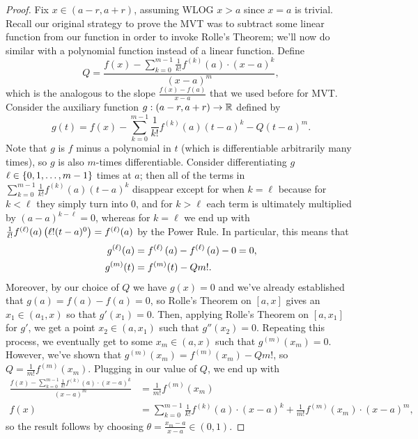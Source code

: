 \documentclass[main.tex]{subfiles}
\begin{document}
\begin{proof}
    Fix $x\in (a - r, a + r)$, assuming WLOG $x > a$ since $x = a$ is trivial. Recall our original strategy to prove the MVT was to subtract some linear function from our function in order to invoke Rolle's Theorem; we'll now do similar with a polynomial function instead of a linear function. Define
    \[Q = \frac{f(x) - \sum_{k = 0}^{m - 1} \frac{1}{k!}f^{(k)}(a)\cdot (x - a)^k}{(x - a)^{m}},\]
    which is the analogous to the slope $\frac{f(x) - f(a)}{x - a}$ that we used before for MVT. Consider the auxiliary function $g : (a - r, a + r) \to \mathbb R$ defined by
    \[g(t) = f(x) - \sum_{k = 0}^{m - 1} \frac{1}{k!}f^{(k)}(a)(t - a)^k - Q(t - a)^m.\]
    Note that $g$ is $f$ minus a polynomial in $t$ (which is differentiable arbitrarily many times), so $g$ is also $m$-times differentiable. Consider differentiating $g$ $\ell\in \left\{ 0, 1, \ldots , m - 1 \right\}$ times at $a$; then all of the terms in $\sum_{k = 0}^{m - 1} \frac{1}{k!}f^{(k)}(a)(t - a)^k$ disappear except for when $k = \ell$ because for $k < \ell$ they simply turn into $0$, and for $k > \ell$ each term is ultimately multiplied by $(a - a)^{k - \ell} = 0$, whereas for $k = \ell$ we end up with $\frac{1}{\ell!}f^{(\ell)}(a)\left( \ell!(t - a)^0 \right) = f^{(\ell)}(a)$ by the Power Rule. In particular, this means that
    \begin{align*}
        g^{(\ell)}(a) &= f^{(\ell)}\left( a \right) - f^{(\ell)}\left( a \right) - 0 = 0, \\
        g^{(m)}(t) &= f^{(m)}(t) - Qm!.
    \end{align*}
    Moreover, by our choice of $Q$ we have $g(x) = 0$ and we've already established that $g(a) = f(a) - f(a) = 0$, so Rolle's Theorem on $[a, x]$ gives an $x_1\in (a_1, x)$ so that $g'(x_1) = 0$. Then, applying Rolle's Theorem on $[a, x_1]$ for $g'$, we get a point $x_2\in (a, x_1)$ such that $g''(x_2) = 0$. Repeating this process, we eventually get to some $x_m\in (a, x)$ such that $g^{(m)}(x_m) = 0$. However, we've shown that $g^{(m)}(x_m) = f^{(m)}(x_m) - Qm!$, so $Q = \frac{1}{m!}f^{(m)}(x_m)$. Plugging in our value of $Q$, we end up with
    \begin{align*}
        \frac{f(x) - \sum_{k = 0}^{m - 1} \frac{1}{k!}f^{(k)}(a)\cdot (x - a)^k}{(x - a)^{m}} &= \frac{1}{m!}f^{(m)}(x_m) \\
        f(x) &= \sum_{k = 0}^{m - 1} \frac{1}{k!}f^{(k)}(a)\cdot (x - a)^k + \frac{1}{m!}f^{(m)}(x_m)\cdot (x - a)^m,
    \end{align*}
    so the result follows by choosing $\theta = \frac{x_m - a}{x - a}\in (0, 1)$.
\end{proof}
\end{document}
